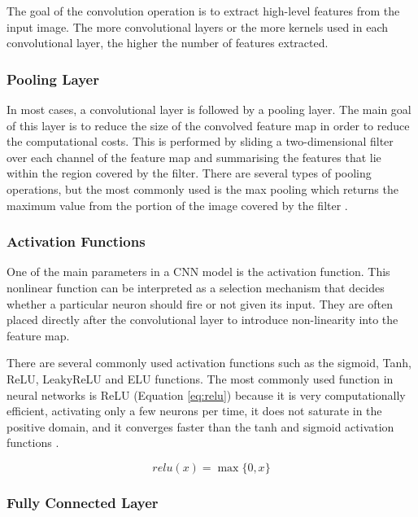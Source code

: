 The goal of the convolution operation is to extract high-level features from the input image. The more convolutional layers or the more kernels used in each convolutional layer, the higher the number of features extracted.



\subsubsection*{Pooling Layer}

In most cases, a convolutional layer is followed by a pooling layer. The main goal of this layer is to reduce the size of the convolved feature map in order to reduce the computational costs. This is performed by sliding a two-dimensional filter over each channel of the feature map and summarising the features that lie within the region covered by the filter. There are several types of pooling operations, but the most commonly used is the max pooling which returns the maximum value from the portion of the image covered by the filter \cite{2018guide}.

\subsubsection*{Activation Functions}

One of the main parameters in a \ac{CNN} model is the activation function. This nonlinear function can be interpreted as a selection mechanism that decides whether a particular neuron should fire or not given its input. They are often placed directly after the convolutional layer to introduce non-linearity into the feature map.

There are several commonly used activation functions such as the sigmoid, \ac{Tanh}, \ac{ReLU}, \ac{LeakyReLU} and \ac{ELU} functions. The most commonly used function in neural networks is \ac{ReLU} (Equation \ref{eq:relu}) because it is very computationally efficient, activating only a few neurons per time, it does not saturate in the positive domain, and it converges faster than the tanh and sigmoid activation functions \cite{2018activation}.

\begin{equation}
    relu(x) = \max{\{0,x\}}
    \label{eq:relu}
\end{equation}

\subsubsection*{Fully Connected Layer}

